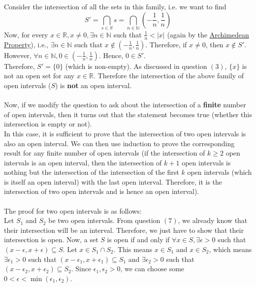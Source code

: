 \documentclass{article}
\begin{document}
\begin{enumerate}
	Consider the intersection of all the sets in this family, i.e. we want to find
	\begin{equation*}
		S' = \bigcap_{s \in S} s = \bigcap_{n \in \mathbb{N}} \left(-\frac{1}{n}, \frac{1}{n}\right)
	\end{equation*}
	Now, for every $x \in \mathbb{R}, x \neq 0, \exists n \in \mathbb{N}$ such that $\frac{1}{n} < |x|$ (again by the \href{https://en.wikipedia.org/wiki/Archimedean_property}{Archimedean Property}), i.e., $\exists n \in \mathbb{N}$ such that $x \notin \left(-\frac{1}{n}, \frac{1}{n}\right)$.
	Therefore, if $x \neq 0$, then $x \notin S'$.
	However, $\forall n \in \mathbb{N}, 0 \in \left(-\frac{1}{n}, \frac{1}{n}\right)$. Hence, $0 \in S'$.
	\\Therefore, $S' = \{0\}$ (which is non-empty). As discussed in question $(3)$, $\{x\}$ is not an open set for any $x \in \mathbb{R}$. Therefore the intersection of the above family of open intervals ($S$) is \textbf{not} an open interval.
	\\\\Now, if we modify the question to ask about the intersection of a \textbf{finite} number of open intervals, then it turns out that the statement becomes true (whether this intersection is empty or not).
	\\In this case, it is sufficient to prove that the intersection of two open intervals is also an open interval. We can then use induction to prove the corresponding result for any finite number of open intervals
	(if the intersection of $k \geq 2$ open intervals is an open interval, then the intersection of $k+1$ open intervals is nothing but the intersection of the intersection of the first $k$ open intervals (which is itself an open interval) with the last open interval. Therefore, it is the intersection of two open intervals and is hence an open interval).
	\\\\The proof for two open intervals is as follows:
	\\Let $S_{1}$ and $S_{2}$ be two open intervals. From question $(7)$, we already know that their intersection will be an interval. Therefore, we just have to show that their intersection is open.
	Now, a set $S$ is open if and only if $\forall x \in S, \exists \epsilon > 0$ such that $(x - \epsilon, x + \epsilon) \subseteq S$. Let $x \in S_{1} \cap S_{2}$. This means $x \in S_{1}$ and $x \in S_{2}$, which means
	$\exists \epsilon_{1} > 0$ such that $(x - \epsilon_{1}, x + \epsilon_{1}) \subseteq S_{1}$ and $\exists \epsilon_{2} > 0$ such that $(x - \epsilon_{2}, x + \epsilon_{2}) \subseteq S_{2}$. Since $\epsilon_{1}, \epsilon_{2} > 0$, we can choose some $0 < \epsilon < \min(\epsilon_{1}, \epsilon_{2})$.

\end{enumerate}
\end{document}
